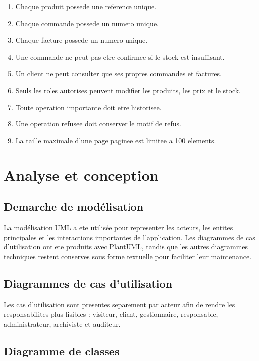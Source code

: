 \documentclass[12pt,a4paper]{report}
\begin{document}
\begin{enumerate}
  \item Chaque produit possede une reference unique.
  \item Chaque commande possede un numero unique.
  \item Chaque facture possede un numero unique.
  \item Une commande ne peut pas etre confirmee si le stock est insuffisant.
  \item Un client ne peut consulter que ses propres commandes et factures.
  \item Seuls les roles autorises peuvent modifier les produits, les prix et le stock.
  \item Toute operation importante doit etre historisee.
  \item Une operation refusee doit conserver le motif de refus.
  \item La taille maximale d'une page paginee est limitee a 100 elements.
\end{enumerate}

\chapter{Analyse et conception}

\section{Demarche de modélisation}

La modélisation UML a ete utilisée pour representer les acteurs, les entites principales et les interactions importantes de l'application. Les diagrammes de cas d'utilisation ont ete produits avec PlantUML, tandis que les autres diagrammes techniques restent conserves sous forme textuelle pour faciliter leur maintenance.

\section{Diagrammes de cas d'utilisation}

Les cas d'utilisation sont presentes separement par acteur afin de rendre les responsabilites plus lisibles : visiteur, client, gestionnaire, responsable, administrateur, archiviste et auditeur.



\section{Diagramme de classes}
\end{document}
